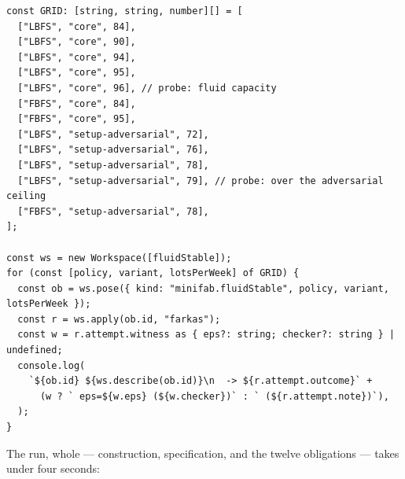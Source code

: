 \begin{Verbatim}[fontsize=\small,frame=leftline,rulecolor=\color{accentmid},framesep=3mm,xleftmargin=3mm]
const GRID: [string, string, number][] = [
  ["LBFS", "core", 84],
  ["LBFS", "core", 90],
  ["LBFS", "core", 94],
  ["LBFS", "core", 95],
  ["LBFS", "core", 96], // probe: fluid capacity
  ["FBFS", "core", 84],
  ["FBFS", "core", 95],
  ["LBFS", "setup-adversarial", 72],
  ["LBFS", "setup-adversarial", 76],
  ["LBFS", "setup-adversarial", 78],
  ["LBFS", "setup-adversarial", 79], // probe: over the adversarial ceiling
  ["FBFS", "setup-adversarial", 78],
];

const ws = new Workspace([fluidStable]);
for (const [policy, variant, lotsPerWeek] of GRID) {
  const ob = ws.pose({ kind: "minifab.fluidStable", policy, variant, lotsPerWeek });
  const r = ws.apply(ob.id, "farkas");
  const w = r.attempt.witness as { eps?: string; checker?: string } | undefined;
  console.log(
    `${ob.id} ${ws.describe(ob.id)}\n  -> ${r.attempt.outcome}` +
      (w ? ` eps=${w.eps} (${w.checker})` : ` (${r.attempt.note})`),
  );
}
\end{Verbatim}

The run, whole --- construction, specification, and the twelve
obligations --- takes under four seconds:

